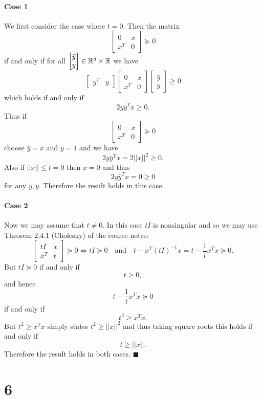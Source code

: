 \documentclass[letterpaper,12pt,oneside,onecolumn]{article}
\begin{document}
\paragraph{Case 1}
We first consider the case where $t = 0$. Then the matrix $$\begin{bmatrix}0 & x \\ x^T & 0 \end{bmatrix} \succcurlyeq 0$$ if and only if for all $\begin{bmatrix} \bar{y} \\y \end{bmatrix} \in \mathbb{R}^d \times \mathbb{R}$ we have
$$\begin{bmatrix}\bar{y}^T & y \end{bmatrix} \begin{bmatrix}0 & x \\ x^T & 0 \end{bmatrix} \begin{bmatrix} \bar{y} \\y \end{bmatrix} \geq 0$$
which holds if and only if
$$2y\bar{y}^Tx \geq 0.$$
Thus if $$\begin{bmatrix}0 & x \\ x^T & 0 \end{bmatrix} \succcurlyeq 0$$ choose $\bar{y} = x$ and $y = 1$ and we have
$$2y\bar{y}^Tx  = 2||x||^2 \geq 0.$$
Also if $||x|| \leq t = 0$ then $x = 0$ and thus
$$2y\bar{y}^Tx = 0  \geq 0$$
for any $\bar{y}, y$. Therefore the result holds in this case.
\paragraph{Case 2}
Now we may assume that $t\neq 0$. In this case $tI$ is nonsingular and so we may use Theorem $2.4.1$ (Cholesky) of the course notes:
$$\begin{bmatrix}tI & x \\ x^T & t \end{bmatrix} \succcurlyeq 0 \iff tI \succcurlyeq 0 \quad \text{and}\quad t - x^T(tI)^{-1}x  = t - \frac{1}{t}x^Tx \succcurlyeq 0.$$
But $tI \succcurlyeq 0$ if and only if
$$ t\geq 0,$$
and hence 
$$t - \frac{1}{t}x^Tx \succcurlyeq 0 $$
if and only if $$t^2 \geq x^Tx.$$
But $t^2 \geq x^Tx$ simply states $t^2 \geq ||x||^2$ and thus taking square roots this holds if and only if
$$t \geq ||x||.$$
Therefore the result holds in both cases. $\blacksquare$
\section*{6}
\end{document}
